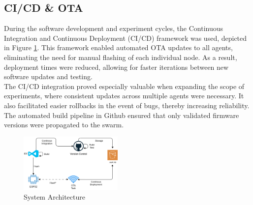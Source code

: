 \documentclass[conference]{IEEEtran}
\begin{document}
\subsection{CI/CD \& OTA}\label{sec:ota}
During the software development and experiment cycles, the Continuous Integration and Continuous Deployment (CI/CD) framework was used, depicted in Figure \ref{fig:cicd-architecture}. This framework enabled automated OTA updates to all agents, eliminating the need for manual flashing of each individual node. As a result, deployment times were reduced, allowing for faster iterations between new software updates and testing.\\ %
The CI/CD integration proved especially valuable when expanding the scope of experiments, where consistent updates across multiple agents were necessary. It also facilitated easier rollbacks in the event of bugs, thereby increasing reliability. The automated build pipeline in Github ensured that only validated firmware versions were propagated to the swarm.\\

\begin{figure}[h]
    \centering
    \includegraphics[width=0.45\textwidth]{architecture.png}
    \caption{System Architecture}
    \label{fig:cicd-architecture}
\end{figure}
\end{document}
